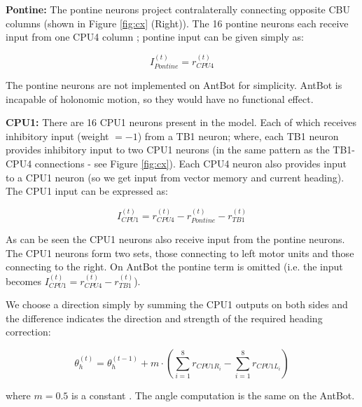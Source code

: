 \documentclass[a4paper,11pt,twoside,openright]{article}
\begin{document}
\textbf{Pontine:}
The pontine neurons project contralaterally connecting opposite CBU columns
(shown in Figure \ref{fig:cx} (Right)). The 16 pontine neurons each receive input
from one CPU4 column \cite{Stone2017}; pontine input can be given simply as:
\newline
\par

\begin{equation}
  I_{Pontine}^{(t)} = r_{CPU4}^{(t)}
\end{equation}

The pontine neurons are not implemented on AntBot for simplicity. AntBot is
incapable of holonomic motion, so they would have no functional effect.
\newline
\par

\textbf{CPU1:}
There are 16 CPU1 neurons present in the model. Each of which
receives inhibitory input (weight $= -1$) from a TB1 neuron; where, each
TB1 neuron provides inhibitory input to two CPU1 neurons (in the same pattern
as the TB1-CPU4 connections - see Figure \ref{fig:cx}). Each CPU4 neuron also
provides input to a CPU1 neuron (so we get input from vector memory and current
heading). The CPU1 input can be expressed as:

\begin{equation}
  I_{CPU1}^{(t)} = r_{CPU4}^{(t)} - r_{Pontine}^{(t)} - r_{TB1}^{(t)}
\end{equation}

As can be seen the CPU1 neurons also receive input from the pontine neurons.
The CPU1 neurons form two sets, those connecting to left motor units and those
connecting to the right. On AntBot the pontine term is omitted
(i.e. the input becomes
$I_{CPU1}^{(t)} = r_{CPU4}^{(t)} - r_{TB1}^{(t)}$).
\newline
\par

We choose a direction simply by summing the CPU1 outputs on both sides
and the difference indicates the direction and strength of the
required heading correction:

\begin{equation}
  \theta_h^{(t)} = \theta_h^{(t - 1)} +
  m \cdot (\sum_{i = 1}^{8} r_{CPU1R_{i}} - \sum_{i = 1}^{8} r_{CPU1L_{i}})
\end{equation}

where $m = 0.5$ is a constant \cite{Stone2017}. The angle computation is the
same on the AntBot.
\newline
\par
\end{document}

